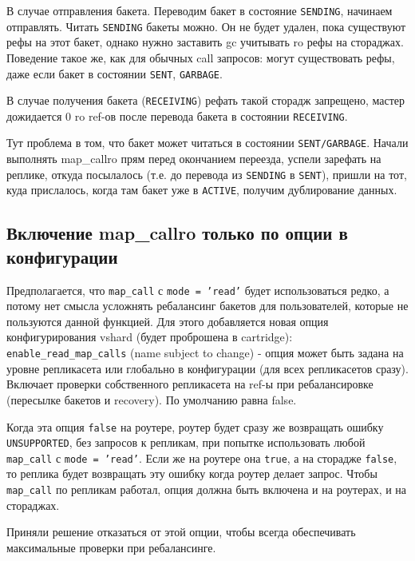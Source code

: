 В случае отправления бакета. Переводим бакет в состояние \texttt{SENDING},
начинаем отправлять. Читать \texttt{SENDING} бакеты можно. Он не будет удален,
пока существуют рефы на этот бакет, однако нужно заставить gc учитывать ro рефы
на стораджах. Поведение такое же, как для обычных call запросов: могут
существовать рефы, даже если бакет в состоянии \texttt{SENT}, \texttt{GARBAGE}.

В случае получения бакета (\texttt{RECEIVING}) рефать такой сторадж запрещено,
мастер дожидается 0 ro ref-ов после перевода бакета в состоянии
\texttt{RECEIVING}.

Тут проблема в том, что бакет может читаться в состоянии \texttt{SENT/GARBAGE}.
Начали выполнять map\_callro прям перед окончанием переезда, успели зарефать на
реплике, откуда посылалось (т.е. до перевода из \texttt{SENDING} в
\texttt{SENT}), пришли на тот, куда прислалось, когда там бакет уже в
\texttt{ACTIVE}, получим дублирование данных.

\subsection*{Включение map\_callro только по опции в конфигурации}

Предполагается, что \texttt{map\_call} с \texttt{mode = 'read'} будет
использоваться редко, а потому нет смысла усложнять ребалансинг бакетов для
пользователей, которые не пользуются данной функцией. Для этого добавляется
новая опция конфигурирования vshard (будет проброшена в cartridge):
\texttt{enable\_read\_map\_calls} (name subject to change) - опция может быть
задана на уровне репликасета или глобально в конфигурации (для всех
репликасетов сразу). Включает проверки собственного репликасета на ref-ы при
ребалансировке (пересылке бакетов и recovery). По умолчанию равна false.

Когда эта опция \texttt{false} на роутере, роутер будет сразу же возвращать
ошибку \texttt{UNSUPPORTED}, без запросов к репликам, при попытке использовать
любой \texttt{map\_call} с \texttt{mode = 'read'}. Если же на роутере она
\texttt{true}, а на сторадже \texttt{false}, то реплика будет возвращать эту
ошибку когда роутер делает запрос. Чтобы \texttt{map\_call} по репликам работал,
опция должна быть включена и на роутерах, и на стораджах.

Приняли решение отказаться от этой опции, чтобы всегда обеспечивать
максимальные проверки при ребалансинге.
